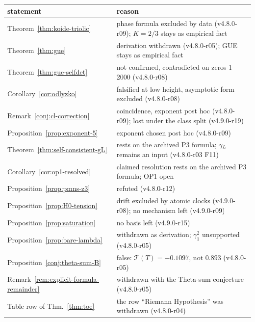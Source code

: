 \begin{center}
\small
\begin{longtable}{@{}>{\raggedright\arraybackslash}p{}>{\raggedright\arraybackslash}p{}@{}}
\toprule
statement & reason\\
\midrule
Theorem~\ref{thm:koide-triolic} & phase formula excluded by data (v4.8.0-r09); \(K=2/3\) stays as empirical fact\\
Theorem~\ref{thm:gue} & derivation withdrawn (v4.8.0-r05); GUE stays as empirical fact\\
Theorem~\ref{thm:gue-selfdet} & not confirmed, contradicted on zeros 1--2000 (v4.8.0-r08)\\
Corollary~\ref{cor:odlyzko} & falsified at low height, asymptotic form excluded (v4.8.0-r08)\\
Remark~\ref{conj:cl-correction} & coincidence, exponent post hoc (v4.8.0-r09); lost under the class split (v4.9.0-r19)\\
Proposition~\ref{prop:exponent-5} & exponent chosen post hoc (v4.8.0-r09)\\
Theorem~\ref{thm:self-consistent-gL} & rests on the archived P3 formula; \(\gamma_L\) remains an input (v4.8.0-r03 F11)\\
Corollary~\ref{cor:op1-resolved} & claimed resolution rests on the archived P3 formula; OP1 open\\
Proposition~\ref{prop:pmns-z3} & refuted (v4.8.0-r12)\\
Proposition~\ref{prop:H0-tension} & drift excluded by atomic clocks (v4.9.0-r08); no mechanism left (v4.9.0-r09)\\
Proposition~\ref{prop:saturation} & no basis left (v4.9.0-r15)\\
Proposition~\ref{prop:bare-lambda} & withdrawn as derivation; \(\gamma_1^2\) unsupported (v4.8.0-r05)\\
Proposition~\ref{conj:theta-sum-B} & false: \(\mathcal T(T)=-0.1097\), not \(0.893\) (v4.8.0-r05)\\
Remark~\ref{rem:explicit-formula-remainder} & withdrawn with the Theta-sum conjecture (v4.8.0-r05)\\
Table row of Thm.~\ref{thm:toe} & the row ``Riemann Hypothesis'' was withdrawn (v4.8.0-r04)\\
\bottomrule
\end{longtable}
\end{center}

